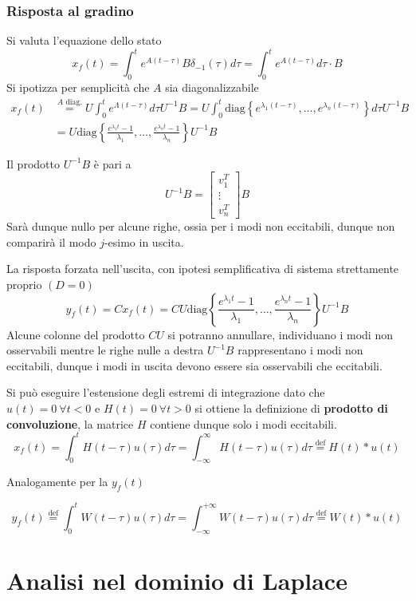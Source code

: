 \subsection{Risposta al gradino}
Si valuta l'equazione dello stato
$$
x_f(t) = \int_0^t e^{A(t-\tau)}B\delta_{-1}(\tau)d\tau =
\int_0^t e^{A(t-\tau)} d\tau\cdot B
$$
Si ipotizza per semplicità che $A$ sia
diagonalizzabile
$$\begin{aligned}
x_f(t)&\stackrel{A\text{ diag.}}{=}
U\int_0^t e^{\Lambda(t-\tau)}d\tau U^{-1} B = U
\int_0^t\text{diag}\left\{e^{\lambda_1(t-\tau)}
,\ldots,e^{\lambda_n(t-\tau)}
\right\} d \tau U^{-1}B\\
&= U\text{diag}\left\{
\frac{e^{\lambda_1t}-1}{\lambda_1},\ldots,\frac{e^{\lambda_nt}-1}{\lambda_n}
\right\}U^{-1}B
\end{aligned}$$

Il prodotto $U^{-1}B$ è pari a
$$
U^{-1}B = \begin{bmatrix}
           v_1^T \\
           \vdots \\
           v_n^T
          \end{bmatrix}B
$$
Sarà dunque nullo per alcune righe, ossia per i modi non eccitabili, dunque non
comparirà il modo $j$-esimo in uscita.

La risposta forzata nell'uscita, con ipotesi semplificativa di sistema
strettamente proprio $(D=0)$
$$
y_f(t) = Cx_f(t) = CU\text{diag}\left\{
\frac{e^{\lambda_1t}-1}{\lambda_1},\ldots,\frac{e^{\lambda_nt}-1}{\lambda_n}
\right\}U^{-1}B
$$
Alcune colonne del prodotto $CU$ si potranno annullare, individuano i modi non
osservabili mentre le righe nulle a destra $U^{-1}B$ rappresentano i modi non
eccitabili, dunque i modi in uscita devono essere sia osservabili che
eccitabili.

Si può eseguire l'estensione degli estremi di integrazione dato che
$u(t)=0\ \forall t<0$ e $H(t) = 0\ \forall t>0$
si ottiene la definizione di \textbf{prodotto di convoluzione}, la matrice $H$
contiene dunque solo i modi eccitabili.
$$
x_f(t) = \int_0^t H(t-\tau) u(\tau) d\tau = \int_{-\infty}^{\infty} H(t-\tau)
u(\tau)d\tau \stackrel{\text{def}}{=} H(t)*u(t)
$$

Analogamente per la $y_f(t)$

$$
y_f(t) \stackrel{\text{def}}{=} \int_0^t W(t-\tau)u(\tau)d\tau =
\int_{-\infty}^{+\infty}W(t-\tau)u(\tau)d\tau \stackrel{\text{def}}{=}W(t)*u(t)
$$

\chapter{Analisi nel dominio di Laplace}
